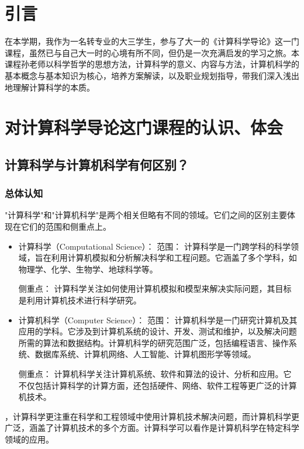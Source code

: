 \documentclass[square]{article}
\begin{document}
\thispagestyle{empty}
\newpage
\setcounter{page}{1}
\section{引言}
在本学期，我作为一名转专业的大三学生，参与了大一的《计算科学导论》这一门课程，虽然已与自己大一时的心境有所不同，但仍是一次充满启发的学习之旅。本课程孙老师以科学哲学的思想方法，计算科学的意义、内容与方法，计算机科学的基本概念与基本知识为核心，培养方案解读，以及职业规划指导，带我们深入浅出地理解计算科学的本质。

\section{对计算科学导论这门课程的认识、体会}
\subsection{计算科学与计算机科学有何区别？}

\subsubsection{总体认知}
"计算科学"和"计算机科学"是两个相关但略有不同的领域。它们之间的区别主要体现在它们的范围和侧重点上。\par
\begin{itemize}
\item 计算科学（Computational Science）：
范围： 计算科学是一门跨学科的科学领域，旨在利用计算机模拟和分析解决科学和工程问题。它涵盖了多个学科，如物理学、化学、生物学、地球科学等。\par
侧重点： 计算科学关注如何使用计算机模拟和模型来解决实际问题，其目标是利用计算机技术进行科学研究。\par

\item 计算机科学（Computer Science）：
范围： 计算机科学是一门研究计算机及其应用的学科。它涉及到计算机系统的设计、开发、测试和维护，以及解决问题所需的算法和数据结构。计算机科学的研究范围广泛，包括编程语言、操作系统、数据库系统、计算机网络、人工智能、计算机图形学等领域\cite{ref1}。\par
侧重点： 计算机科学关注计算机系统、软件和算法的设计、分析和应用。它不仅包括计算科学的计算方面，还包括硬件、网络、软件工程等更广泛的计算机技术。\par
\end{itemize}
，计算科学更注重在科学和工程领域中使用计算机技术解决问题，而计算机科学更广泛，涵盖了计算机技术的多个方面。计算科学可以看作是计算机科学在特定科学领域的应用。\par
\end{document}
